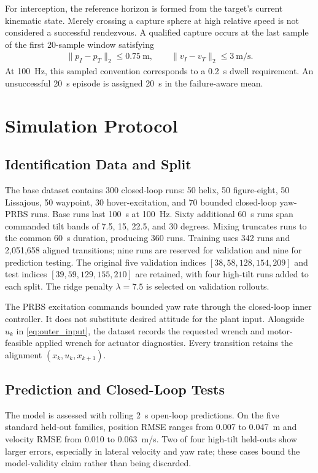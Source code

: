 \documentclass[letterpaper,10pt,conference]{ieeeconf}
\begin{document}
For interception, the reference horizon is formed from the target's current
kinematic state. Merely crossing a capture sphere at high relative speed is
not considered a successful rendezvous. A qualified capture occurs at the
last sample of the first 20-sample window satisfying
\begin{align}
\|p_I-p_T\|_2\le0.75~\mathrm{m},\qquad
\|v_I-v_T\|_2\le3~\mathrm{m/s}.
\label{eq:capture}
\end{align}
At 100~Hz, this sampled convention corresponds to a 0.2~s dwell requirement.
An unsuccessful 20~s episode is assigned 20~s in the failure-aware mean.

\section{Simulation Protocol}
\label{sec:simulation_setup}

\subsection{Identification Data and Split}

The base dataset contains 300 closed-loop runs: 50 helix, 50 figure-eight,
50 Lissajous, 50 waypoint, 30 hover-excitation, and 70 bounded closed-loop
yaw-PRBS runs. Base runs last 100~s at 100~Hz. Sixty additional 60~s runs span
commanded tilt bands of 7.5, 15, 22.5, and 30 degrees. Mixing truncates runs to
the common 60~s duration, producing 360 runs. Training uses 342 runs and
2,051,658 aligned transitions; nine runs are reserved for validation and nine
for prediction testing. The original five validation indices
$[38,58,128,154,209]$ and test indices $[39,59,129,155,210]$ are retained,
with four high-tilt runs added to each split. The ridge penalty
$\lambda=7.5$ is selected on validation rollouts.

The PRBS excitation commands bounded yaw rate through the closed-loop inner
controller. It does not substitute desired attitude for the plant input.
Alongside $u_k$ in \eqref{eq:outer_input}, the dataset records the requested
wrench and motor-feasible applied wrench for actuator diagnostics. Every
transition retains the alignment $(x_k,u_k,x_{k+1})$.

\subsection{Prediction and Closed-Loop Tests}

The model is assessed with rolling 2~s open-loop predictions. On the five
standard held-out families, position RMSE ranges from 0.007 to 0.047~m and
velocity RMSE from 0.010 to 0.063~m/s. Two of four high-tilt held-outs show
larger errors, especially in lateral velocity and yaw rate; these cases bound
the model-validity claim rather than being discarded.
\end{document}
